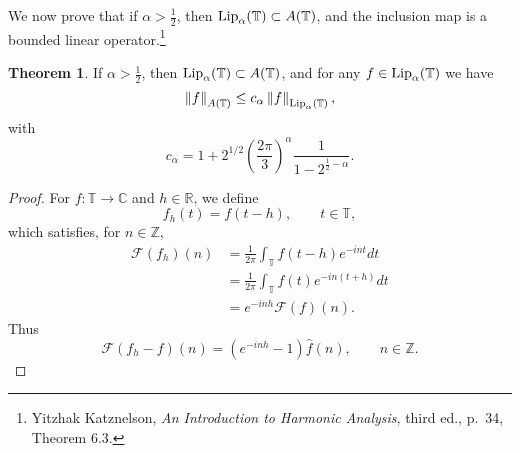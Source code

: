 \documentclass{article}
\newcommand{\Lip}{\ensuremath\mathrm{Lip}}
\newcommand{\norm}[1]{\left\Vert #1 \right\Vert}
\theoremstyle{definition}
\newtheorem{theorem}{Theorem}
\theoremstyle{definition}
\begin{document}
We now prove that if $\alpha>\frac{1}{2}$, then 
$\Lip_\alpha(\mathbb{T}) \subset A(\mathbb{T})$, and the inclusion map is a bounded linear operator.\footnote{Yitzhak Katznelson, {\em An Introduction to Harmonic Analysis}, third ed., p.~34, Theorem 6.3.}

\begin{theorem}
If $\alpha>\frac{1}{2}$, 
then $\Lip_\alpha(\mathbb{T}) \subset A(\mathbb{T})$, and
for any $f \in \Lip_\alpha(\mathbb{T})$ we have
\[
\norm{f}_{A(\mathbb{T})} \leq c_\alpha \norm{f}_{\Lip_\alpha(\mathbb{T})},
\]
with
\[
c_\alpha = 1+ 2^{1/2} \left( \frac{2\pi}{3} \right)^\alpha  \frac{1}{1-2^{\frac{1}{2}-\alpha}}.
\]
\end{theorem}
\begin{proof}
For $f:\mathbb{T} \to \mathbb{C}$ and $h \in \mathbb{R}$, we define
\[
f_h(t)=f(t-h), \qquad t \in \mathbb{T},
\]
which satisfies, for $n \in \mathbb{Z}$,
\begin{align*}
\mathscr{F}(f_h)(n)&=\frac{1}{2\pi} \int_{\mathbb{T}} f(t-h) e^{-int} dt\\
&=\frac{1}{2\pi} \int_{\mathbb{T}} f(t) e^{-in(t+h)} dt\\
&=e^{-inh} \mathscr{F}(f)(n).
\end{align*}
Thus
\begin{equation}
\mathscr{F}(f_h-f)(n) = (e^{-inh}-1)\hat{f}(n), \qquad n \in \mathbb{Z}.
\label{translation}
\end{equation}



\end{proof}
\end{document}
